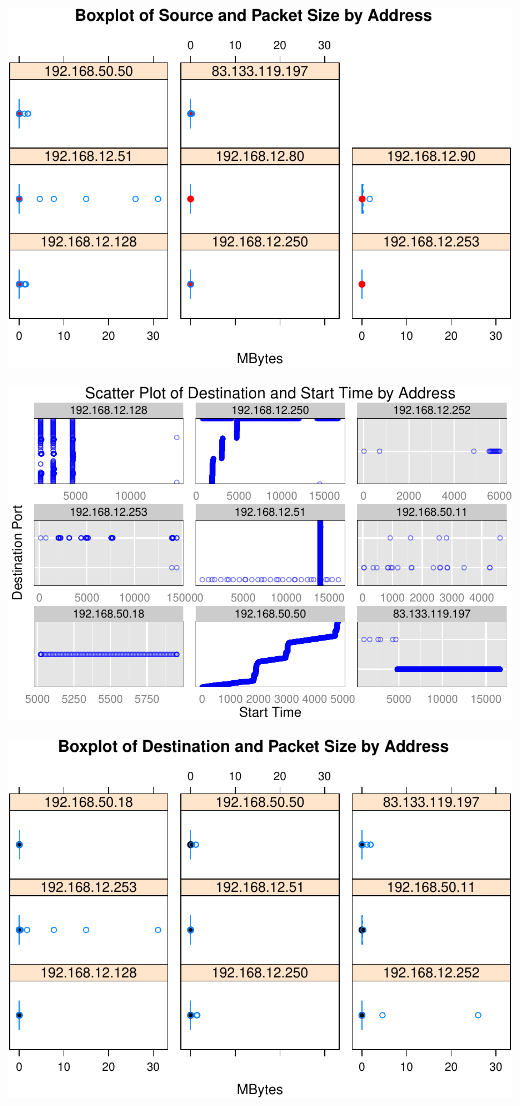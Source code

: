 \documentclass[]{article}
\begin{document}
\begin{center}\includegraphics{edaReport_files/figure-latex/unnamed-chunk-23-1} \end{center}

\pagebreak

\begin{center}\includegraphics{edaReport_files/figure-latex/unnamed-chunk-24-1} \end{center}

\begin{center}\includegraphics{edaReport_files/figure-latex/unnamed-chunk-25-1} \end{center}
\end{document}
